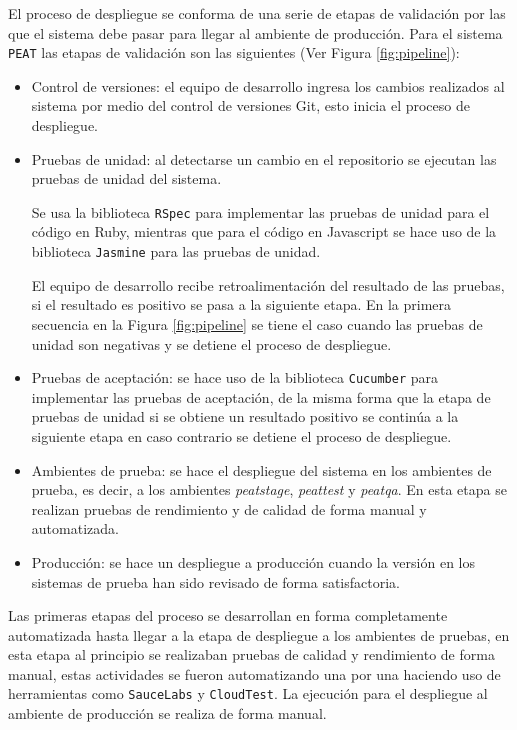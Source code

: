 El proceso de despliegue se conforma de una serie de etapas de validación por las
que el sistema debe pasar para llegar al ambiente de producción. Para el sistema
\texttt{PEAT} las etapas de validación son las siguientes (Ver Figura
\ref{fig:pipeline}):
\begin{itemize}
\item Control de versiones: el equipo de desarrollo ingresa los cambios
  realizados al sistema por medio del control de versiones Git, esto inicia
  el proceso de despliegue.
\item Pruebas de unidad: al detectarse un cambio en el repositorio se ejecutan las
  pruebas de unidad del sistema.

  Se usa la biblioteca \texttt{RSpec} para implementar las pruebas de unidad
  para el código en Ruby, mientras que para el código en Javascript se hace uso de
  la biblioteca \texttt{Jasmine} para las pruebas de unidad.

  El equipo de desarrollo recibe retroalimentación del resultado de las pruebas,
  si el resultado es positivo se pasa a la siguiente etapa.
  En la primera secuencia en la Figura \ref{fig:pipeline} se tiene el caso
  cuando las pruebas de unidad son negativas y se detiene el proceso de despliegue.
\item Pruebas de aceptación: se hace uso de la biblioteca \texttt{Cucumber}
  para implementar las pruebas de aceptación, de la misma forma que la etapa de
  pruebas de unidad si se obtiene un resultado positivo se continúa a la siguiente
  etapa en caso contrario se detiene el proceso de despliegue.
\item Ambientes de prueba: se hace el despliegue del sistema en los ambientes de
  prueba, es decir, a los ambientes \textit{peatstage}, \textit{peattest} y
  \textit{peatqa}. En esta etapa se realizan pruebas de rendimiento y de calidad
  de forma manual y automatizada.
\item Producción: se hace un despliegue a producción cuando la versión en los
  sistemas de prueba han sido revisado de forma satisfactoria.
\end{itemize}


Las primeras etapas del proceso se desarrollan en forma completamente automatizada
hasta llegar a la etapa de despliegue a los ambientes de pruebas, en esta etapa
al principio se realizaban pruebas de calidad y rendimiento de forma manual, estas
actividades se fueron automatizando una por una  haciendo uso de herramientas como
\texttt{SauceLabs} y \texttt{CloudTest}. La ejecución para el despliegue al ambiente
de producción se realiza de forma manual.

